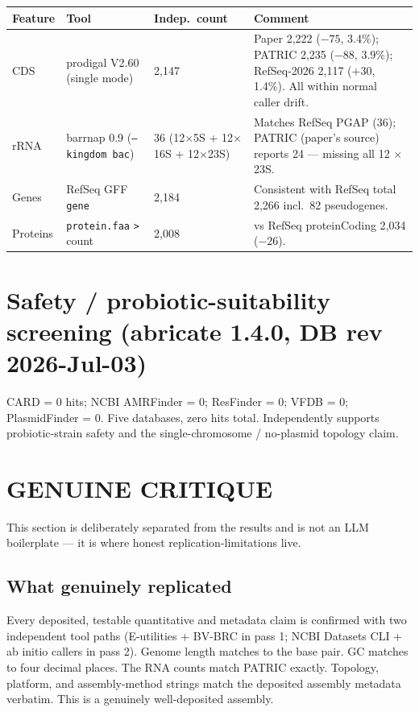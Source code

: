 \documentclass[11pt,letterpaper]{article}
\begin{document}
\begin{longtable}{p{}p{}p{}p{}}
\toprule
\textbf{Feature} & \textbf{Tool} & \textbf{Indep.\ count} & \textbf{Comment} \\
\midrule
CDS & prodigal V2.60 (single mode) & 2{,}147 & Paper 2{,}222 ($-75$, 3.4\%); PATRIC 2{,}235 ($-88$, 3.9\%); RefSeq-2026 2{,}117 ($+30$, 1.4\%). All within normal caller drift. \\
rRNA & barrnap 0.9 (\texttt{--kingdom bac}) & 36 (12$\times$5S + 12$\times$16S + 12$\times$23S) & Matches RefSeq PGAP (36); PATRIC (paper's source) reports 24 --- missing all 12 $\times$ 23S. \\
Genes & RefSeq GFF \texttt{gene} & 2{,}184 & Consistent with RefSeq total 2{,}266 incl.\ 82 pseudogenes. \\
Proteins & \texttt{protein.faa} \texttt{>} count & 2{,}008 & vs RefSeq proteinCoding 2{,}034 ($-26$). \\
\bottomrule
\end{longtable}

\section{Safety / probiotic-suitability screening (abricate 1.4.0, DB rev 2026-Jul-03)}

CARD = 0 hits; NCBI AMRFinder = 0; ResFinder = 0; VFDB = 0; PlasmidFinder = 0. Five databases, zero hits total. Independently supports probiotic-strain safety and the single-chromosome / no-plasmid topology claim.

\section{GENUINE CRITIQUE}

This section is deliberately separated from the results and is not an LLM boilerplate --- it is where honest replication-limitations live.

\subsection*{What genuinely replicated}
Every deposited, testable quantitative and metadata claim is confirmed with two independent tool paths (E-utilities + BV-BRC in pass 1; NCBI Datasets CLI + ab initio callers in pass 2). Genome length matches to the base pair. GC matches to four decimal places. The RNA counts match PATRIC exactly. Topology, platform, and assembly-method strings match the deposited assembly metadata verbatim. This is a genuinely well-deposited assembly.
\end{document}
